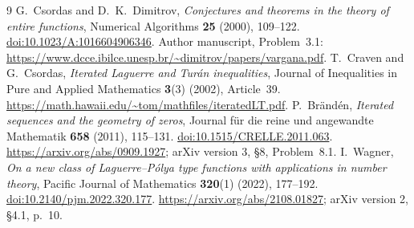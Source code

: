 \documentclass[11pt]{article}
\begin{document}
{\small
\begin{thebibliography}{9}
G.~Csordas and D.~K.~Dimitrov,
\emph{Conjectures and theorems in the theory of entire functions},
Numerical Algorithms \textbf{25} (2000), 109--122.
\href{https://doi.org/10.1023/A:1016604906346}{doi:10.1023/A:1016604906346}.
Author manuscript, Problem~3.1:
\url{https://www.dcce.ibilce.unesp.br/~dimitrov/papers/vargana.pdf}.
T.~Craven and G.~Csordas,
\emph{Iterated Laguerre and Tur\'an inequalities},
Journal of Inequalities in Pure and Applied Mathematics \textbf{3}(3)
(2002), Article~39.
\url{https://math.hawaii.edu/~tom/mathfiles/iteratedLT.pdf}.
P.~Br\"and\'en,
\emph{Iterated sequences and the geometry of zeros},
Journal f\"ur die reine und angewandte Mathematik \textbf{658}
(2011), 115--131.
\href{https://doi.org/10.1515/CRELLE.2011.063}{doi:10.1515/CRELLE.2011.063}.
\url{https://arxiv.org/abs/0909.1927}; arXiv version 3, \S8, Problem~8.1.
I.~Wagner,
\emph{On a new class of Laguerre--P\'olya type functions with applications
in number theory}, Pacific Journal of Mathematics \textbf{320}(1)
(2022), 177--192.
\href{https://doi.org/10.2140/pjm.2022.320.177}{doi:10.2140/pjm.2022.320.177}.
\url{https://arxiv.org/abs/2108.01827}; arXiv version 2, \S4.1, p.~10.
\end{thebibliography}
}
\end{document}
